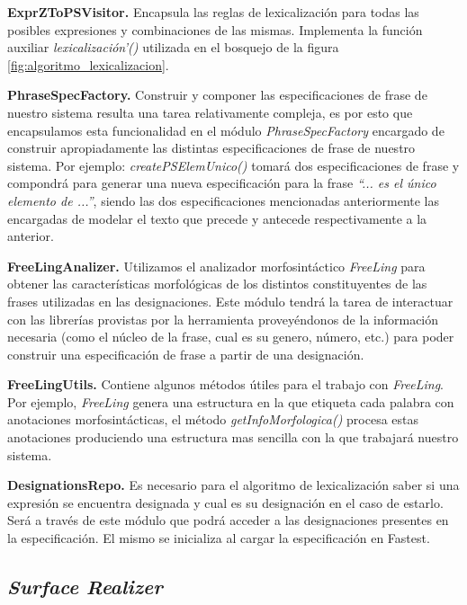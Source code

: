 \bigskip
\noindent
\textbf{ExprZToPSVisitor.} Encapsula las reglas de lexicalización para todas las posibles expresiones y combinaciones de las mismas. Implementa la función auxiliar \textit{lexicalización'()} utilizada en el bosquejo de la figura \ref{fig:algoritmo_lexicalizacion}.

\bigskip
\noindent
\textbf{PhraseSpecFactory.} Construir y componer las especificaciones de frase de nuestro sistema resulta una tarea relativamente compleja, es por esto que encapsulamos esta funcionalidad en el módulo \textit{PhraseSpecFactory} encargado de construir apropiadamente las distintas especificaciones de frase de nuestro sistema. Por ejemplo: \textit{createPSElemUnico()} tomará dos especificaciones de frase y compondrá para generar una nueva especificación para la frase \textit{``... es el único elemento de ...''}, siendo las dos especificaciones mencionadas anteriormente las encargadas de modelar el texto que precede y antecede respectivamente a la anterior.

\bigskip
\noindent
\textbf{FreeLingAnalizer.} Utilizamos el analizador morfosintáctico \textit{FreeLing} para obtener las características morfológicas de los distintos constituyentes de las frases utilizadas en las designaciones. Este módulo tendrá la tarea de interactuar con las librerías provistas por la herramienta proveyéndonos de la información necesaria (como el núcleo de la frase, cual es su genero, número, etc.) para poder construir una especificación de frase a partir de una designación.

\bigskip
\noindent
\textbf{FreeLingUtils.} Contiene algunos métodos útiles para el trabajo con \textit{FreeLing}. Por ejemplo, \textit{FreeLing} genera una estructura en la que etiqueta cada palabra con anotaciones morfosintácticas, el método \textit{getInfoMorfologica()} procesa estas anotaciones produciendo una estructura mas sencilla con la que trabajará nuestro sistema.

\bigskip
\noindent
\textbf{DesignationsRepo.} Es necesario para el algoritmo de lexicalización saber si una expresión se encuentra designada y cual es su designación en el caso de estarlo. Será a través de este módulo que podrá acceder a las designaciones presentes en la especificación. El mismo se inicializa al cargar la especificación en Fastest. 

\subsection{\textit{Surface Realizer}}

